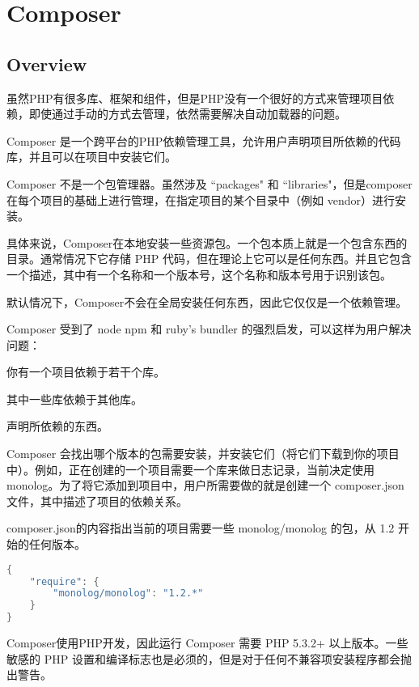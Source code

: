 \part{Composer}



\chapter{Overview}

虽然PHP有很多库、框架和组件，但是PHP没有一个很好的方式来管理项目依赖，即使通过手动的方式去管理，依然需要解决自动加载器的问题。

Composer 是一个跨平台的PHP依赖管理工具，允许用户声明项目所依赖的代码库，并且可以在项目中安装它们。

Composer 不是一个包管理器。虽然涉及 ``packages" 和 ``libraries"，但是composer在每个项目的基础上进行管理，在指定项目的某个目录中（例如 vendor）进行安装。

具体来说，Composer在本地安装一些资源包。一个包本质上就是一个包含东西的目录。通常情况下它存储 PHP 代码，但在理论上它可以是任何东西。并且它包含一个描述，其中有一个名称和一个版本号，这个名称和版本号用于识别该包。

默认情况下，Composer不会在全局安装任何东西，因此它仅仅是一个依赖管理。

Composer 受到了 node npm 和 ruby's bundler 的强烈启发，可以这样为用户解决问题：

\begin{compactenum}
\item 你有一个项目依赖于若干个库。

\item 其中一些库依赖于其他库。

\item 声明所依赖的东西。
\end{compactenum}

Composer 会找出哪个版本的包需要安装，并安装它们（将它们下载到你的项目中）。例如，正在创建的一个项目需要一个库来做日志记录，当前决定使用 monolog。为了将它添加到项目中，用户所需要做的就是创建一个 composer.json 文件，其中描述了项目的依赖关系。

composer.json的内容指出当前的项目需要一些 monolog/monolog 的包，从 1.2 开始的任何版本。

\begin{lstlisting}[language=Java]
{
    "require": {
        "monolog/monolog": "1.2.*"
    }
}
\end{lstlisting}

Composer使用PHP开发，因此运行 Composer 需要 PHP 5.3.2+ 以上版本。一些敏感的 PHP 设置和编译标志也是必须的，但是对于任何不兼容项安装程序都会抛出警告。

